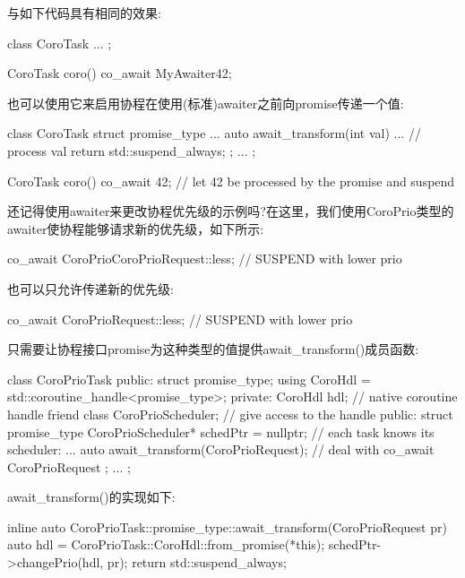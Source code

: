 与如下代码具有相同的效果:

\begin{cpp}
class CoroTask {
	...
};

CoroTask coro()
{
	co_await MyAwaiter{42};
}
\end{cpp}

也可以使用它来启用协程在使用(标准)awaiter之前向promise传递一个值:

\begin{cpp}
class CoroTask {
	struct promise_type {
		...
		auto await_transform(int val) {
			... // process val
			return std::suspend_always{};
		}
	};
	...
};

CoroTask coro()
{
	co_await 42; // let 42 be processed by the promise and suspend
}
\end{cpp}


还记得使用awaiter来更改协程优先级的示例吗?在这里，我们使用CoroPrio类型的awaiter使协程能够请求新的优先级，如下所示:

\begin{cpp}
co_await CoroPrio{CoroPrioRequest::less}; // SUSPEND with lower prio
\end{cpp}

也可以只允许传递新的优先级:

\begin{cpp}
co_await CoroPrioRequest::less; // SUSPEND with lower prio
\end{cpp}

只需要让协程接口promise为这种类型的值提供await\_transform()成员函数:

\begin{cpp}
class CoroPrioTask {
public:
	struct promise_type;
	using CoroHdl = std::coroutine_handle<promise_type>;
private:
	CoroHdl hdl; // native coroutine handle
	friend class CoroPrioScheduler; // give access to the handle
public:
	struct promise_type {
		CoroPrioScheduler* schedPtr = nullptr; // each task knows its scheduler:
		...
		auto await_transform(CoroPrioRequest); // deal with co_await CoroPrioRequest
	};
	...
};
\end{cpp}

await\_transform()的实现如下:

\begin{cpp}
inline auto CoroPrioTask::promise_type::await_transform(CoroPrioRequest pr) {
	auto hdl = CoroPrioTask::CoroHdl::from_promise(*this);
	schedPtr->changePrio(hdl, pr);
	return std::suspend_always{};
}
\end{cpp}

